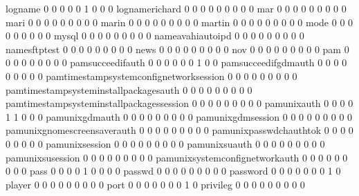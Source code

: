 \documentclass[compress,8pt]{beamer}
\begin{document}
\begin{frame}
\begin{Schunk}
  logname                                    0   0   0   0   0   1   0   0   0
  lognamerichard                             0   0   0   0   0   0   0   0   0
  mar                                        0   0   0   0   0   0   0   0   0
  mari                                       0   0   0   0   0   0   0   0   0
  marin                                      0   0   0   0   0   0   0   0   0
  martin                                     0   0   0   0   0   0   0   0   0
  mode                                       0   0   0   0   0   0   0   0   0
  mysql                                      0   0   0   0   0   0   0   0   0
  nameavahiautoipd                           0   0   0   0   0   0   0   0   0
  namesftptest                               0   0   0   0   0   0   0   0   0
  news                                       0   0   0   0   0   0   0   0   0
  nov                                        0   0   0   0   0   0   0   0   0
  pam                                        0   0   0   0   0   0   0   0   0
  pamsucceedifauth                           0   0   0   0   0   0   1   0   0
  pamsucceedifgdmauth                        0   0   0   0   0   0   0   0   0
  pamtimestampsystemconfignetworksession     0   0   0   0   0   0   0   0   0
  pamtimestampsysteminstallpackagesauth      0   0   0   0   0   0   0   0   0
  pamtimestampsysteminstallpackagessession   0   0   0   0   0   0   0   0   0
  pamunixauth                                0   0   0   0   1   1   0   0   0
  pamunixgdmauth                             0   0   0   0   0   0   0   0   0
  pamunixgdmsession                          0   0   0   0   0   0   0   0   0
  pamunixgnomescreensaverauth                0   0   0   0   0   0   0   0   0
  pamunixpasswdchauthtok                     0   0   0   0   0   0   0   0   0
  pamunixsession                             0   0   0   0   0   0   0   0   0
  pamunixsuauth                              0   0   0   0   0   0   0   0   0
  pamunixsusession                           0   0   0   0   0   0   0   0   0
  pamunixsystemconfignetworkauth             0   0   0   0   0   0   0   0   0
  pass                                       0   0   0   0   1   0   0   0   0
  passwd                                     0   0   0   0   0   0   0   0   0
  password                                   0   0   0   0   0   0   0   1   0
  player                                     0   0   0   0   0   0   0   0   0
  port                                       0   0   0   0   0   0   0   1   0
  privileg                                   0   0   0   0   0   0   0   0   0

\end{Schunk}
\end{frame}
\end{document}

